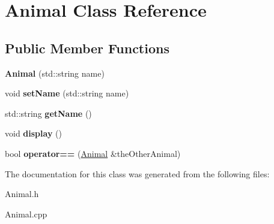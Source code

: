 \hypertarget{class_animal}{}\section{Animal Class Reference}
\label{class_animal}
\subsection*{Public Member Functions}
\begin{DoxyCompactItemize}
\item 
\mbox{\label{class_animal_a2a0139ca9fe858e46632e05e07cb2b75}} 
{\bfseries Animal} (std\+::string name)
\item 
\mbox{\label{class_animal_a818a8a3722387f889f656da29138fc6a}} 
void {\bfseries set\+Name} (std\+::string name)
\item 
\mbox{\label{class_animal_ae6566fd9ecddb8ebcdb77a6c44ea8896}} 
std\+::string {\bfseries get\+Name} ()
\item 
\mbox{\label{class_animal_a429089b83e28535e41fb0bea47cc6333}} 
void {\bfseries display} ()
\item 
\mbox{\label{class_animal_a63b0132f69e60148481b583c7a91e87a}} 
bool {\bfseries operator==} (\mbox{\hyperlink{class_animal}{Animal}} \&the\+Other\+Animal)
\end{DoxyCompactItemize}


The documentation for this class was generated from the following files\+:\begin{DoxyCompactItemize}
\item 
Animal.\+h\item 
Animal.\+cpp\end{DoxyCompactItemize}
